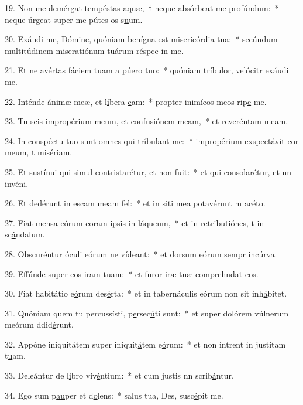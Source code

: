 19. Non me demérgat tempéstas \uline{a}quæ,~† neque absórbeat m\uline{e} prof\uline{ú}ndum:~* neque úrgeat super me pútes os s\uline{u}um.\par 
20. Exáudi me, Dómine, quóniam benígna est miseric\uline{ó}rdia t\uline{u}a:~* secúndum multitúdinem miseratiónum tuárum réspce \uline{i}n me.\par 
21. Et ne avértas fáciem tuam a p\uline{ú}ero t\uline{u}o:~* quóniam tríbulor, velócitr ex\uline{áu}di me.\par 
22. Inténde ánimæ meæ, et l\uline{í}bera \uline{e}am:~* propter inimícos meos rip\uline{e} me.\par 
23. Tu scis impropérium meum, et confusi\uline{ó}nem m\uline{e}am,~* et reveréntam m\uline{e}am.\par 
24. In conspéctu tuo sunt omnes qui tr\uline{í}bul\uline{a}nt me:~* impropérium exspectávit cor meum, t mis\uline{é}riam.\par 
25. Et sustínui qui simul contristarétur, \uline{e}t non f\uline{u}it:~* et qui consolarétur, et nn inv\uline{é}ni.\par 
26. Et dedérunt in \uline{e}scam m\uline{e}am fel:~* et in siti mea potavérunt m ac\uline{é}to.\par 
27. Fiat mensa eórum coram \uline{i}psis in l\uline{á}queum,~* et in retributiónes, t in sc\uline{á}ndalum.\par 
28. Obscuréntur óculi e\uline{ó}rum ne v\uline{í}deant:~* et dorsum eórum sempr inc\uline{ú}rva.\par 
29. Effúnde super eos \uline{i}ram t\uline{u}am:~* et furor iræ tuæ comprehndat \uline{e}os.\par 
30. Fiat habitátio e\uline{ó}rum des\uline{é}rta:~* et in tabernáculis eórum non sit  inh\uline{á}bitet.\par 
31. Quóniam quem tu percussísti, p\uline{e}rsec\uline{ú}ti sunt:~* et super dolórem vúlnerum meórum ddid\uline{é}runt.\par 
32. Appóne iniquitátem super iniquit\uline{á}tem e\uline{ó}rum:~* et non intrent in justítam t\uline{u}am.\par 
33. Deleántur de l\uline{i}bro viv\uline{é}ntium:~* et cum justis nn scrib\uline{á}ntur.\par 
34. Ego sum p\uline{au}per et d\uline{o}lens:~* salus tua, Des, susc\uline{é}pit me.\par 
